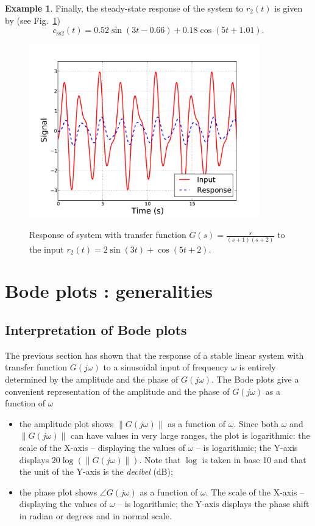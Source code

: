 \documentclass[a4paper,11pt]{report}
\theoremstyle{definition}
\newtheorem{mdexample}{Example}
\newenvironment{example}%
  {\vspace{0.1cm}\begin{mdframed}[backgroundcolor=lightgray]\begin{mdexample}}%
  {\end{mdexample}\end{mdframed}\vspace{0.1cm}}
\begin{document}
\begin{example}
  Finally, the steady-state response of the system to $r_2(t)$ is given
  by (see Fig.~\ref{fig:sine-resp2})
  \[
  c_\mathrm{ss2}(t) = 0.52\sin(3t-0.66) +  0.18\cos(5t+1.01).
  \]

  \begin{figure}[H]
    \centering
    \includegraphics[width=10cm]{fig/sine-resp2.pdf}\\
    \caption{Response of system with transfer function
      $G(s)=\frac{s}{(s+1)(s+2)}$ to the input $r_2(t) = 2\sin(3t) +
      \cos(5t+2)$.} 
    \label{fig:sine-resp2}
  \end{figure}


\end{example}


\section{Bode plots : generalities}

\subsection{Interpretation of Bode plots}

The previous section has shown that the response of a stable linear
system with transfer function $G(j\omega)$ to a sinusoidal input of
frequency $\omega$ is entirely determined by the amplitude and the
phase of $G(j\omega)$. The Bode plots give a convenient representation
of the amplitude and the phase of $G(j\omega)$ as a function of
$\omega$
\begin{itemize}
\item the amplitude plot shows $\|G(j\omega)\|$ as a function of
  $\omega$. Since both $\omega$ and $\|G(j\omega)\|$ can have values
  in very large ranges, the plot is logarithmic: the scale of the
  X-axis -- displaying the values of $\omega$ -- is logarithmic; the
  Y-axis displays $20\log(\|G(j\omega)\|)$. Note that $\log$ is taken
  in base 10 and that the unit of the Y-axis is the \emph{decibel}
  (dB);
\item the phase plot shows $\angle G(j\omega)$ as a function of
  $\omega$. The scale of the X-axis -- displaying the values of
  $\omega$ -- is logarithmic; the Y-axis displays the phase shift in
  radian or degrees and in normal scale.
\end{itemize}
\end{document}
